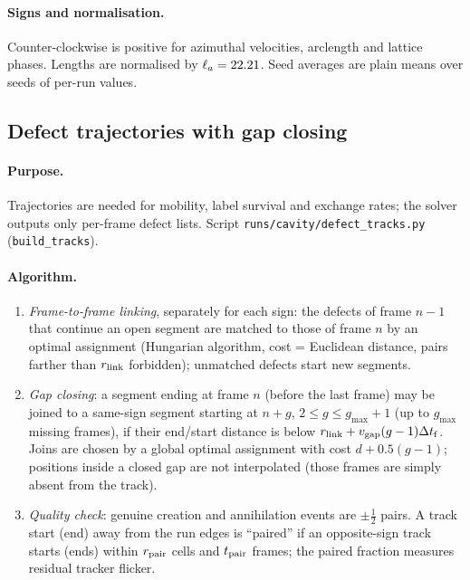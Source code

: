 \paragraph{Signs and normalisation.} Counter-clockwise is positive for azimuthal velocities, arclength and lattice phases. Lengths are
normalised by $\ell_a=22.21$. Seed averages are plain means over seeds of per-run values.

\subsection{Defect trajectories with gap closing}
\label{sec:md-tracks}

\paragraph{Purpose.} Trajectories are needed for mobility, label survival and exchange rates; the solver outputs only per-frame
defect lists. Script \texttt{runs/cavity/defect\_tracks.py} (\texttt{build\_tracks}).

\paragraph{Algorithm.}
\begin{enumerate}
\item \emph{Frame-to-frame linking}, separately for each sign: the defects of frame $n-1$ that continue an open segment are matched to
  those of frame $n$ by an optimal assignment (Hungarian algorithm, cost = Euclidean distance, pairs farther than $r_{\rm link}$ forbidden);
  unmatched defects start new segments.
\item \emph{Gap closing}: a segment ending at frame $n$ (before the last frame) may be joined to a same-sign segment starting at $n+g$,
  $2\le g\le g_{\max}+1$ (up to $g_{\max}$ missing frames), if their end/start distance is below
  $r_{\rm link}+v_{\rm gap}(g-1)\Delta t_{\rm f}$. Joins are chosen by a global optimal assignment with cost
  $d+0.5(g-1)$; positions inside a closed gap are not interpolated (those frames are simply absent from the track).
\item \emph{Quality check}: genuine creation and annihilation events are $\pm\tfrac12$ pairs. A track start (end) away from the run edges is
  ``paired'' if an opposite-sign track starts (ends) within $r_{\rm pair}$ cells and $t_{\rm pair}$ frames; the paired fraction measures residual
  tracker flicker.
\end{enumerate}


